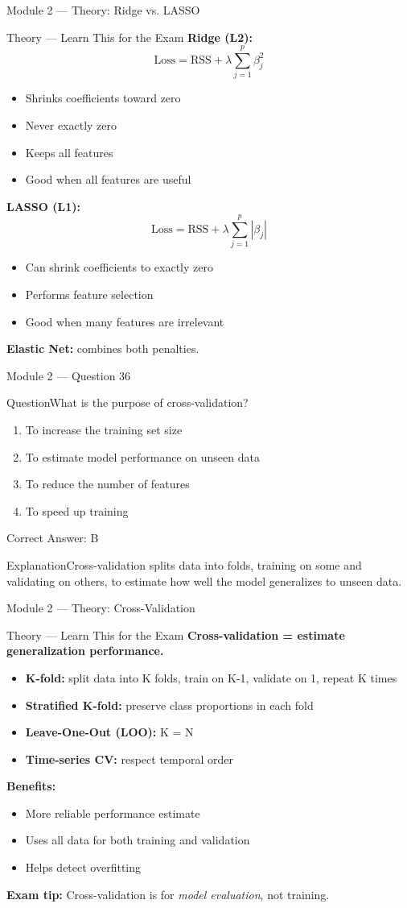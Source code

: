 \documentclass[aspectratio=169,10pt]{beamer}
\newcommand{\question}[1]{\begin{block}{Question}#1\end{block}}
\newcommand{\options}[4]{%
	\begin{enumerate}[label=\Alph*.,leftmargin=*]
		\item #1
		\item #2
		\item #3
		\item #4
	\end{enumerate}
}
\newcommand{\answerbox}[1]{\begin{exampleblock}{Correct Answer: #1}\end{exampleblock}}
\newcommand{\explain}[1]{\begin{block}{Explanation}#1\end{block}}
\newcommand{\theory}[1]{%
	\begin{block}{Theory --- Learn This for the Exam}
		\small #1
	\end{block}
}
\begin{document}
	\begin{frame}{Module 2 --- Theory: Ridge vs. LASSO}
		\theory{
			\textbf{Ridge (L2):}
			\[
			\text{Loss} = \text{RSS} + \lambda \sum_{j=1}^{p} \beta_j^2
			\]
			\begin{itemize}
				\item Shrinks coefficients toward zero
				\item Never exactly zero
				\item Keeps all features
				\item Good when all features are useful
			\end{itemize}
			\textbf{LASSO (L1):}
			\[
			\text{Loss} = \text{RSS} + \lambda \sum_{j=1}^{p} |\beta_j|
			\]
			\begin{itemize}
				\item Can shrink coefficients to exactly zero
				\item Performs feature selection
				\item Good when many features are irrelevant
			\end{itemize}
			\textbf{Elastic Net:} combines both penalties.
		}
	\end{frame}
	
	\begin{frame}{Module 2 --- Question 36}
		\question{What is the purpose of cross-validation?}
		\options{To increase the training set size}{To estimate model performance on unseen data}{To reduce the number of features}{To speed up training}
		\answerbox{B}
		\explain{Cross-validation splits data into folds, training on some and validating on others, to estimate how well the model generalizes to unseen data.}
	\end{frame}
	
	\begin{frame}{Module 2 --- Theory: Cross-Validation}
		\theory{
			\textbf{Cross-validation = estimate generalization performance.}
			\begin{itemize}
				\item \textbf{K-fold:} split data into K folds, train on K-1, validate on 1, repeat K times
				\item \textbf{Stratified K-fold:} preserve class proportions in each fold
				\item \textbf{Leave-One-Out (LOO):} K = N
				\item \textbf{Time-series CV:} respect temporal order
			\end{itemize}
			\textbf{Benefits:}
			\begin{itemize}
				\item More reliable performance estimate
				\item Uses all data for both training and validation
				\item Helps detect overfitting
			\end{itemize}
			\textbf{Exam tip:} Cross-validation is for \emph{model evaluation}, not training.
		}
	\end{frame}
	
\end{document}
